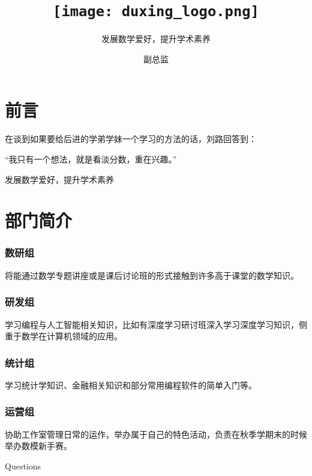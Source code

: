 \documentclass[presentation]{beamer}
\institute{\texttt{[image: sysu\_logo.png]}\texttt{[image: duxing\_logo.png]}}
\title{\hspace{-13pt}\texttt{[image: duxing\_logo.png]}}
\subtitle{发展数学爱好，提升学术素养}
\author{副总监}
\date{}
\begin{document}
 
\frame{\titlepage}

\section{前言}

\begin{frame}[standout]
    在谈到如果要给后进的学弟学妹一个学习的方法的话，刘路回答到：
    
    “我只有一个想法，就是看淡分数，重在兴趣。”
\end{frame}

\begin{frame}[standout]
    发展数学爱好，提升学术素养
\end{frame}

\section{部门简介}

\begin{frame}
    \frametitle{数研组}\centering
    将能通过数学专题讲座或是课后讨论班的形式接触到许多高于课堂的数学知识。
\end{frame}

\begin{frame}
	\frametitle{研发组}\centering
	学习编程与人工智能相关知识，比如有深度学习研讨班深入学习深度学习知识，侧重于数学在计算机领域的应用。
\end{frame}

\begin{frame}
	\frametitle{统计组}\centering
	学习统计学知识、金融相关知识和部分常用编程软件的简单入门等。
\end{frame}

\begin{frame}
	\frametitle{运营组}\centering
	协助工作室管理日常的运作，举办属于自己的特色活动，负责在秋季学期末的时候举办数模新手赛。
\end{frame}

\begin{frame}[standout]
    Questions
\end{frame}
\end{document}

